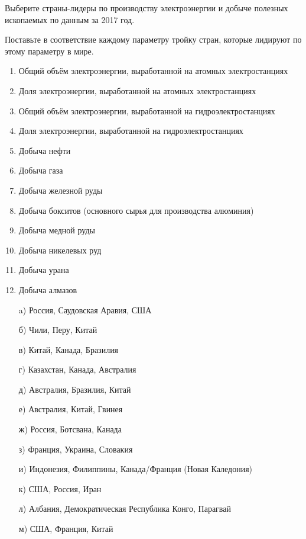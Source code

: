 
Выберите страны-лидеры по производству электроэнергии и добыче полезных ископаемых по данным за 2017 год.

Поставьте в соответствие каждому параметру тройку стран, которые лидируют по этому параметру в мире.

\begin{enumerate}
    \item Общий объём электроэнергии, выработанной на атомных электростанциях
    \item Доля электроэнергии, выработанной на атомных электростанциях
    \item Общий объём электроэнергии, выработанной на гидроэлектростанциях
    \item Доля электроэнергии, выработанной на гидроэлектростанциях
    \item Добыча нефти
    \item Добыча газа
    \item Добыча железной руды
    \item Добыча бокситов (основного сырья для производства алюминия)
    \item Добыча медной руды
    \item Добыча никелевых руд
    \item Добыча урана
    \item Добыча алмазов
\end{enumerate}

\begin{enumerate}
    \item[a)] Россия, Саудовская Аравия, США
    \item[б)] Чили, Перу, Китай
    \item[в)] Китай, Канада, Бразилия
    \item[г)] Казахстан, Канада, Австралия
    \item[д)] Австралия, Бразилия, Китай
    \item[е)] Австралия, Китай, Гвинея
    \item[ж)] Россия, Ботсвана, Канада
    \item[з)] Франция, Украина, Словакия
    \item[и)] Индонезия, Филиппины, Канада/Франция (Новая Каледония)
    \item[к)] США, Россия, Иран
    \item[л)] Албания, Демократическая Республика Конго, Парагвай
    \item[м)] США, Франция, Китай
\end{enumerate} 

